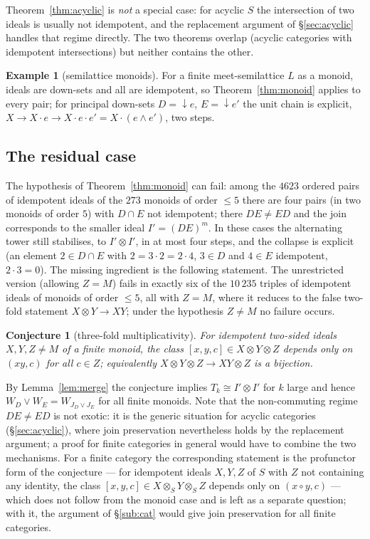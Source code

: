 \documentclass[11pt]{amsart}
\newtheorem{conj}[thm]{Conjecture}
\theoremstyle{definition}
\newtheorem{ex}[thm]{Example}
\begin{document}
Theorem~\ref{thm:acyclic} is \emph{not} a special case: for acyclic $S$ the
intersection of two ideals is usually not idempotent, and the replacement
argument of \S\ref{sec:acyclic} handles that regime directly. The two
theorems overlap (acyclic categories with idempotent intersections) but
neither contains the other.

\begin{ex}[semilattice monoids]
For a finite meet-semilattice $L$ as a monoid, ideals are down-sets and all
are idempotent, so Theorem~\ref{thm:monoid} applies to every pair; for
principal down-sets $D={\downarrow}e$, $E={\downarrow}e'$ the unit chain is
explicit, $X\to X\cdot e\to X\cdot e\cdot e'=X\cdot(e\wedge e')$, two steps.
\end{ex}

\subsection{The residual case}
The hypothesis of Theorem~\ref{thm:monoid} can fail: among the $4623$ ordered pairs of
idempotent ideals of the $273$ monoids of order $\le5$ there are four pairs
(in two monoids of order $5$) with $D\cap E$ not idempotent; there $DE\neq ED$
and the join corresponds to the smaller ideal $I'=(DE)^m$. In these cases
the alternating tower still stabilises, to $I'\otimes I'$, in at most four
steps, and the collapse is explicit (an element $2\in D\cap E$ with $2=3\cdot2
=2\cdot4$, $3\in D$ and $4\in E$ idempotent, $2\cdot3=0$). The missing
ingredient is the following statement. The unrestricted version (allowing
$Z=M$) fails in exactly six of the $10\,235$ triples of idempotent ideals of
monoids of order $\le5$, all with $Z=M$, where it reduces to the false
two-fold statement $X\otimes Y\to XY$; under the hypothesis $Z\neq M$ no
failure occurs.

\begin{conj}[three-fold multiplicativity]\label{conj:threefold}
For idempotent two-sided ideals $X,Y,Z\neq M$ of a finite monoid, the class
$[x,y,c]\in X\otimes Y\otimes Z$ depends only on $(xy,c)$ for \emph{all}
$c\in Z$; equivalently $X\otimes Y\otimes Z\to XY\otimes Z$ is a bijection.
\end{conj}
By Lemma~\ref{lem:merge} the conjecture implies $T_k\cong I'\otimes I'$ for
$k$ large and hence $W_D\vee W_E=W_{J_D\vee J_E}$ for all finite monoids. Note that the non-commuting regime $DE\neq ED$ is not exotic: it is the
generic situation for acyclic categories (\S\ref{sec:acyclic}), where join
preservation nevertheless holds by the replacement argument; a proof for
finite categories in general would have to combine the two mechanisms. For a
finite category the corresponding statement is the profunctor form of the
conjecture --- for idempotent ideals $X,Y,Z$ of $S$ with $Z$ not containing any
identity, the class $[x,y,c]\in X\otimes_SY\otimes_SZ$ depends only on
$(x\circ y,c)$ --- which does not follow from the monoid case and is left as a
separate question; with it, the argument of \S\ref{sub:cat} would give join
preservation for all finite categories.
\end{document}
